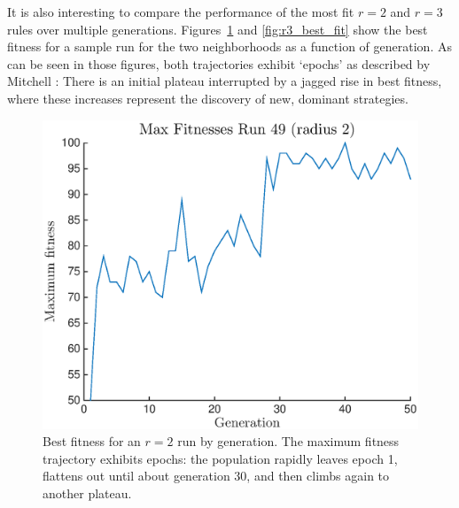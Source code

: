 It is also interesting to compare the performance of the most fit $r = 2$ and $r = 3$ rules over multiple generations. Figures~\ref{fig:r2_best_fit} and 
\ref{fig:r3_best_fit} show the best fitness for a sample run for the two neighborhoods as a function of generation. As can be seen in those figures, both trajectories exhibit `epochs' as described by Mitchell \cite{Mitchell:1994:ECA:186092.186116}: There is an initial plateau interrupted by a jagged rise in 
best fitness, where these increases represent the discovery of new, dominant strategies.

\begin{figure}
\begin{center}
\includegraphics[width=\linewidth]{figures/max_epoch_radius2.eps}
\caption{Best fitness for an $r = 2$ run by generation. The maximum fitness trajectory exhibits epochs: the population rapidly leaves epoch 1, flattens out until about generation 30, and then climbs again to another plateau.}
\label{fig:r2_best_fit}
\end{center}
\end{figure}
